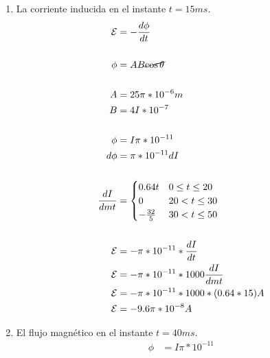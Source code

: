 \documentclass[10pt, twoside]{article}
\begin{document}
\begin{enumerate}
\begin{figure}[H]
		\end{figure}

		\begin{enumerate}
			\item La corriente inducida en el instante $t=15ms$.
				\begin{align*}
					\mathcal{E} &= - \frac{d\phi}{dt} \\
					\\
					\phi &= AB\cancel{\cos{\theta}}\\
					\\
					A &= 25\pi*10^{-6}m \\
					B &= 4I*10^{-7}\\
					\\
					\phi  & = I\pi*10^{-11}\\
					d\phi & = \pi*10^{-11}dI\\
					\\
					\frac{dI}{dmt} &=
					\begin{cases}
						0.64t          & 0 \leq t \leq 20\\
						0              & 20 < t \leq 30\\
						- \frac{32}{5} & 30 < t \leq 50
					\end{cases}\\
					\\
						\mathcal{E} &= -\pi*10^{-11} * \frac{dI}{dt}\\
						\mathcal{E} &= -\pi*10^{-11} * 1000\frac{dI}{dmt}\\
						\mathcal{E} &= -\pi*10^{-11} * 1000*(0.64*15)A\\
						\mathcal{E} &= - 9.6\pi*10^{-8}A
				\end{align*}
			\item El flujo magnético en el instante $t=40ms$.
				\begin{align*}
					\phi &= I\pi*10^{-11}\\

\end{align*}
\end{enumerate}
\end{enumerate}
\end{document}
